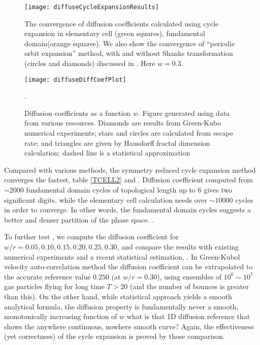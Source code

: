 \documentclass[aps,pre,
                showpacs,
                twocolumn,
                groupedaddress,
                floatfix]{revtex4-1}
\begin{document}
\begin{figure}[htbp]
  \texttt{[image: diffuseCycleExpansionResults]}
  \caption[]{\label{fig-convergence}
  The convergence of diffusion coefficients  calculated using cycle
  expansion in elementary cell (green squares),  fundamental
  domain(orange squares). We  also show the convergence of ``periodic
  orbit expansion'' method, with and  without Shanks transformation
  (circles and diamonds) discussed in  . Here $w = 0.3$.
  }
\end{figure}

\begin{figure}
\texttt{[image: diffuseDiffCoefPlot]}
  \caption[]{\label{fig-results} Diffusion coefficients as a function $w$.  Figure generated using data from various resources. Diamonds are results from  Green-Kubo numerical experiments; stars and  circles are calculated from escape rate; and triangles are  given by Hausdorff fractal dimension calculation; dashed line  is a statistical approximation}.
\end{figure}

Compared with various methods, the symmetry reduced cycle expansion
method converges the fastest, table \ref{TCELL2} and
. Diffusion coefficient computed from $\sim2000$
fundamental domain cycles of topological length up to 6 gives two
significant digits, while the elementary cell calculation needs over
$\sim 10000$ cycles in order to converge. In other words, the fundamental
domain cycles suggests a better and denser partition of the phase space.
    .

To further test , we compute the diffusion
coefficient for $w/r = 0.05, 0.10, 0.15, 0.20, 0.25, 0.30$, and compare
the results with existing numerical experiments and a recent statistical
estimation, . In Green-Kubol velocity
auto-correlation method the  diffusion coefficient can be extrapolated to
the accurate reference value $0.250$ (at $w/r=0.30$), using ensembles of
$10^6\sim10^7$ gas particles flying for long time $T>20$ (and the number
of bounces is greater than this). On the other hand, while
statistical approach yields a smooth analytical
formula, the diffusion property is fundamentally
never a smooth, monotonically increasing function of $w$
    {what is that 1D diffusion reference that shows the anywhere
    continuous, nowhere smooth curve?}
Again, the effectiveness (yet correctness) of the cycle expansion is
proved by those comparison.
\end{document}
